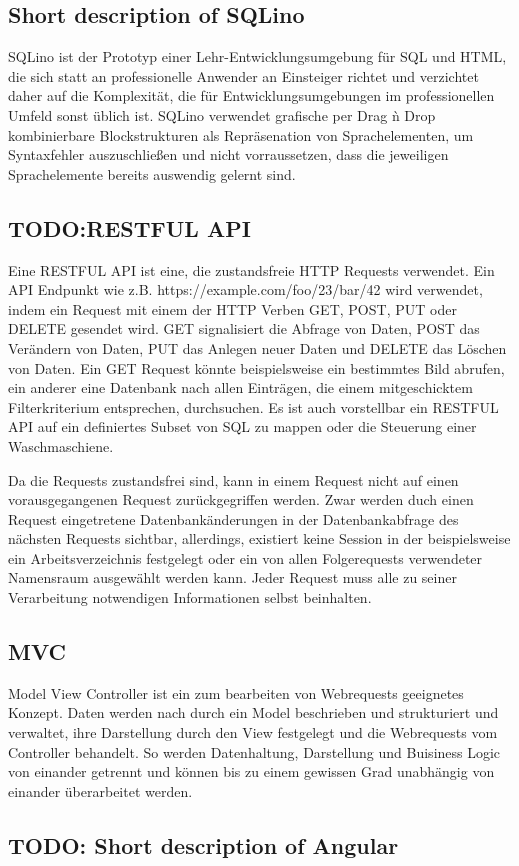 \subsection{Short description of SQLino}

SQLino ist der Prototyp einer Lehr-Entwicklungsumgebung für SQL und HTML, die
sich statt an professionelle Anwender an Einsteiger richtet und verzichtet daher
auf die Komplexität, die für Entwicklungsumgebungen im professionellen Umfeld
sonst üblich ist. SQLino verwendet grafische per Drag \`n Drop kombinierbare
Blockstrukturen als Repräsenation von Sprachelementen, um Syntaxfehler
auszuschließen und nicht vorraussetzen, dass die jeweiligen Sprachelemente
bereits auswendig gelernt sind.

\subsection{TODO:RESTFUL API} Eine RESTFUL API ist eine, die
zustandsfreie HTTP Requests verwendet. Ein API
Endpunkt wie
z.B. https://example.com/foo/23/bar/42 wird verwendet, indem ein
Request mit einem der HTTP Verben GET, POST, PUT oder DELETE gesendet
wird.  GET signalisiert die Abfrage von Daten, POST das Verändern von
Daten, PUT das Anlegen neuer Daten und DELETE das Löschen von
Daten. Ein GET Request könnte beispielsweise ein bestimmtes Bild
abrufen, ein anderer eine Datenbank nach allen Einträgen, die einem
mitgeschicktem Filterkriterium entsprechen, durchsuchen. Es ist auch
vorstellbar ein RESTFUL API auf ein definiertes Subset von SQL zu
mappen oder die Steuerung einer Waschmaschiene.

Da die Requests zustandsfrei sind, kann in einem Request nicht auf
einen vorausgegangenen Request zurückgegriffen werden. Zwar werden
duch einen Request eingetretene Datenbankänderungen in der
Datenbankabfrage des nächsten Requests sichtbar, allerdings, existiert
keine Session in der beispielsweise ein Arbeitsverzeichnis festgelegt
oder ein von allen Folgerequests verwendeter Namensraum ausgewählt
werden kann. Jeder Request muss alle zu seiner Verarbeitung
notwendigen Informationen selbst beinhalten.

\subsection{MVC}
Model View Controller ist ein zum bearbeiten von Webrequests geeignetes Konzept.
Daten werden nach durch ein Model beschrieben und strukturiert und verwaltet,
ihre Darstellung durch den View festgelegt und die Webrequests vom Controller
behandelt. So werden Datenhaltung, Darstellung und Buisiness Logic von einander
getrennt und können bis zu einem gewissen Grad unabhängig von einander
überarbeitet werden.

\subsection{TODO: Short description of Angular}

\todo{}

